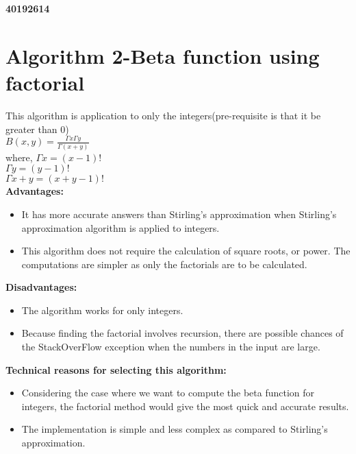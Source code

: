 \documentclass{report}
\begin{document}
\newpage
\hfill\textbf{40192614}
\section*{Algorithm 2-Beta function using factorial}
This algorithm is application to only the integers(pre-requisite is that it be greater than 0) 
\\
\newline
$B(x,y)=\frac{\Gamma x \Gamma y}{\Gamma (x+y)}$\\
\newline where,
$\Gamma x = (x-1)!$\\
\indent\indent $\Gamma y = (y-1)!$\\
\indent\indent $\Gamma x+y = (x+y-1)!$\\
\newline
\textbf{Advantages:}
\begin{itemize}
    \item It has more accurate answers than Stirling's approximation when Stirling's approximation algorithm is applied to integers.
    \item This algorithm does not require the calculation of square roots, or power. The computations are simpler as only the factorials are to be calculated.
\end{itemize}
\newline
\textbf{Disadvantages:}
\begin{itemize}
    \item The algorithm works for only integers.
    \item Because finding the factorial involves recursion, there are possible chances of the StackOverFlow exception when the numbers in the input are large.
\end{itemize}
\textbf{Technical reasons for selecting this algorithm:}
\begin{itemize}
    \item Considering the case where we want to compute the beta function for integers, the factorial method would give the most quick and accurate results.
    \item The implementation is simple and less complex as compared to Stirling's approximation.
\end{itemize}
\end{document}
